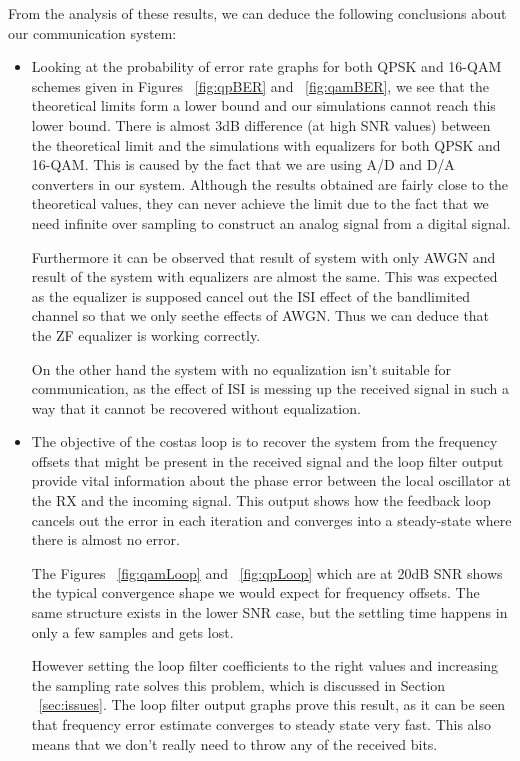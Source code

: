 \documentclass[]{article}
\begin{document}
From the analysis of these results, we can deduce the following conclusions about our communication system:
\begin{itemize}
\item Looking at the probability of error rate graphs for both QPSK and 16-QAM schemes given in Figures ~\ref{fig:qpBER} and ~\ref{fig:qamBER}, we see that the theoretical limits form a lower bound and our simulations cannot reach this lower bound. There is almost 3dB difference (at high SNR values) between the theoretical limit and the simulations with equalizers for both QPSK and 16-QAM. This is caused by the fact that we are using A/D and D/A converters in our system. Although the results obtained are fairly close to the theoretical values, they can never achieve the limit due to the fact that we need infinite over sampling to construct an analog signal from a digital signal. 

Furthermore it can be observed that result of system with only AWGN and result of the system with equalizers are almost the same. This was expected as the equalizer is supposed cancel out the ISI effect of the bandlimited channel so that we only seethe effects of AWGN. Thus we can deduce that the ZF equalizer is working correctly.  

On the other hand the system with no equalization isn't suitable for communication, as the effect of ISI is messing up the received signal in such a way that it cannot be recovered without equalization. 

\item The objective of the costas loop is to recover the system from the frequency offsets that might be present in the received signal and the loop filter output provide vital information about the phase error between the local oscillator at the RX and the incoming signal. This output shows how the feedback loop cancels out the error in each iteration and converges into a steady-state where there is almost no error.  

The Figures ~\ref{fig:qamLoop} and ~\ref{fig:qpLoop} which are at 20dB SNR shows the typical convergence shape we would expect for frequency offsets.  The same structure exists in the lower SNR case, but the settling time happens in only a few samples and gets lost.  

However setting the loop filter coefficients to the right values and increasing the sampling rate solves this problem, which is discussed in Section ~\ref{sec:issues}. The loop filter output graphs prove this result, as it can be seen that frequency error estimate converges to steady state very fast. This also means that we don't really need to throw any of the received bits.


\end{itemize}
\end{document}
